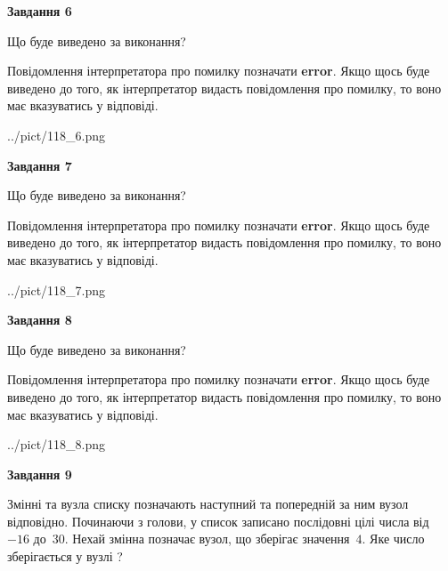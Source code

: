 \documentclass[12pt, ukrainian]{article}
\begin{document}
{\begin {large}
{\begin {center}\textbf{Завдання 6}\end {center}}\par
Що буде виведено за виконання?

Повідомлення інтерпретатора про помилку позначати \textbf{error}.
Якщо щось буде виведено до того, як інтерпретатор видасть повідомлення про помилку, 
то воно має вказуватись у відповіді. \par


\begin{center}
	{../pict/118_6.png}
\end{center}
\newpage

{\begin {center}\textbf{Завдання 7}\end {center}}\par
Що буде виведено за виконання?

Повідомлення інтерпретатора про помилку позначати \textbf{error}.
Якщо щось буде виведено до того, як інтерпретатор видасть повідомлення про помилку, 
то воно має вказуватись у відповіді. \par


\begin{center}
	{../pict/118_7.png}
\end{center}
\newpage

{\begin {center}\textbf{Завдання 8}\end {center}}\par
Що буде виведено за виконання?

Повідомлення інтерпретатора про помилку позначати \textbf{error}.
Якщо щось буде виведено до того, як інтерпретатор видасть повідомлення про помилку, 
то воно має вказуватись у відповіді. \par


\begin{center}
	{../pict/118_8.png}
\end{center}
\newpage

{\begin {center}\textbf{Завдання 9}\end {center}}\par
Змінні  та  вузла списку позначають наступний та попередній за ним вузол відповідно. Починаючи з голови, у список записано послідовні цілі числа від~$-16$ до~$30$. Нехай змінна  позначає вузол, що зберігає значення~$4$.
Яке число зберігається у вузлі  ?\par
\newpage


\end{large}}
\end{document}
